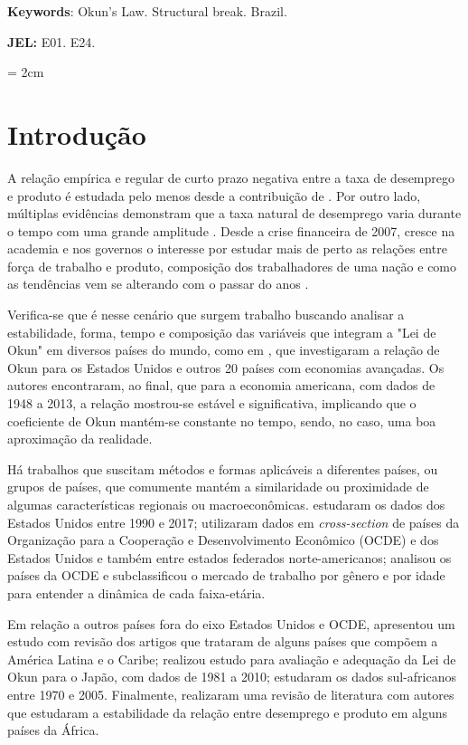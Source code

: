 \documentclass[12pt, openright,oneside, a4paper, english, brazil, section = TITLE, ubsection = Title]{article}
\begin{document}
\textbf{Keywords}: Okun's Law. Structural break. Brazil.

\textbf{JEL:} E01. E24.

\newpage
\topmargin = 2cm
\setlength{\parindent}{1.5cm}

\section{Introdução}

A relação empírica e regular de curto prazo negativa entre a taxa de desemprego e produto é estudada pelo menos desde a contribuição de . Por outro lado, múltiplas evidências demonstram que a taxa natural de desemprego varia durante o tempo com uma grande amplitude \cite{Hall2003}. Desde a crise financeira de 2007, cresce na academia e nos governos o interesse por estudar mais de perto as relações entre força de trabalho e produto, composição dos trabalhadores de uma nação e como as tendências vem se alterando com o passar do anos \cite{Krueger2017}. 

Verifica-se que é nesse cenário que surgem trabalho buscando analisar a estabilidade, forma, tempo e composição das variáveis que integram a "Lei de Okun" em diversos países do mundo, como em , que investigaram a relação de Okun para os Estados Unidos e outros 20 países com economias avançadas. Os autores encontraram, ao final, que para a economia americana, com dados de 1948 a 2013, a relação mostrou-se estável e significativa, implicando que o coeficiente de Okun mantém-se constante no tempo, sendo, no caso, uma boa aproximação da realidade.

Há trabalhos que suscitam métodos e formas aplicáveis a diferentes países, ou grupos de países, que comumente mantém a similaridade ou proximidade de algumas características regionais ou macroeconômicas.  estudaram os dados dos Estados Unidos entre 1990 e 2017; utilizaram dados em \textit{cross-section} de países da Organização para a Cooperação e Desenvolvimento Econômico (OCDE) e dos Estados Unidos e também entre estados federados norte-americanos;  analisou os países da OCDE e subclassificou o mercado de trabalho por gênero e por idade para entender a dinâmica de cada faixa-etária. 

Em relação a outros países fora do eixo Estados Unidos e OCDE,  apresentou um estudo com revisão dos artigos que trataram de alguns países que compõem a América Latina e o Caribe;  realizou estudo para avaliação e adequação da Lei de Okun para o Japão, com dados de 1981 a 2010;  estudaram os dados sul-africanos entre 1970 e 2005. Finalmente,  realizaram uma revisão de literatura com autores que estudaram a estabilidade da relação entre desemprego e produto em alguns países da África.
\end{document}
